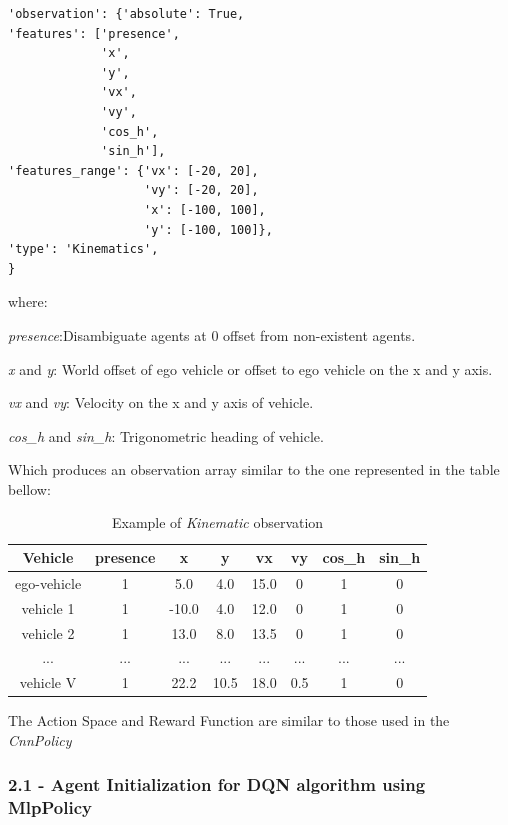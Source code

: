 \begin{lstlisting}[style=python]
'observation': {'absolute': True,
'features': ['presence',
             'x',
             'y',
             'vx',
             'vy',
             'cos_h',
             'sin_h'],
'features_range': {'vx': [-20, 20],
                   'vy': [-20, 20],
                   'x': [-100, 100],
                   'y': [-100, 100]},
'type': 'Kinematics',
}
\end{lstlisting}

where: 

\textit{presence}:Disambiguate agents at 0 offset from non-existent agents.

\textit{x} and \textit{y}: World offset of ego vehicle or offset to ego vehicle on the x and y axis.

\textit{vx} and \textit{vy}: Velocity on the x and y axis of vehicle.

\textit{cos\_h} and \textit{sin\_h}: Trigonometric heading of vehicle.


Which produces an observation array similar to the one represented in the table bellow:

\begin{table}[h!]
    \centering
    \begin{tabular}{|c|c|c|c|c|c|c|c|}
    \hline
    \textbf{Vehicle} & \textbf{presence} & \textbf{x} & \textbf{y} & \textbf{vx} & \textbf{vy} & \textbf{cos\_h} & \textbf{sin\_h} \\ \hline
    ego-vehicle & 1 & 5.0  & 4.0  & 15.0  & 0   & 1  & 0 \\ \hline
    vehicle 1  & 1 & -10.0 & 4.0  & 12.0  & 0   & 1  & 0 \\ \hline
    vehicle 2  & 1 & 13.0  & 8.0  & 13.5  & 0   & 1  & 0 \\ \hline
    ...         & ...   & ...  & ...   & ... & ... & ...& ... \\ \hline
    vehicle V  & 1 & 22.2  & 10.5 & 18.0  & 0.5 & 1  & 0 \\ \hline
    \end{tabular}
    \caption{Example of \textit{Kinematic} observation }
    \label{tab:vehicles}
\end{table}

 The Action Space and Reward Function are similar to those used in the \textit{CnnPolicy} 
    

 \subsubsection{2.1 - Agent Initialization for DQN algorithm using MlpPolicy}

